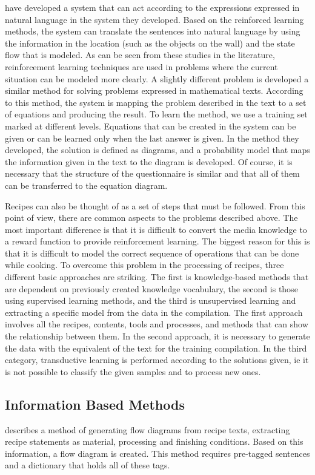 \cite{chen2011learning} have developed a system that can act according to the expressions expressed in natural language in the system they developed. Based on the reinforced learning methods, the system can translate the sentences into natural language by using the information in the location (such as the objects on the wall) and the state flow that is modeled. As can be seen from these studies in the literature, reinforcement learning techniques are used in problems where the current situation can be modeled more clearly.
A slightly different problem is \cite{hosseini2014learning} developed a similar method for solving problems expressed in mathematical texts. According to this method, the system is mapping the problem described in the text to a set of equations and producing the result. To learn the method, we use a training set marked at different levels. Equations that can be created in the system can be given or can be learned only when the last answer is given. In the method they developed, the solution is defined as diagrams, and a probability model that maps the information given in the text to the diagram is developed. Of course, it is necessary that the structure of the questionnaire is similar and that all of them can be transferred to the equation diagram.

Recipes can also be thought of as a set of steps that must be followed. From this point of view, there are common aspects to the problems described above. The most important difference is that it is difficult to convert the media knowledge to a reward function to provide reinforcement learning. The biggest reason for this is that it is difficult to model the correct sequence of operations that can be done while cooking. To overcome this problem in the processing of recipes, three different basic approaches are striking. The first is knowledge-based methods that are dependent on previously created knowledge vocabulary, the second is those using supervised learning methods, and the third is unsupervised learning and extracting a specific model from the data in the compilation. The first approach involves all the recipes, contents, tools and processes, and methods that can show the relationship between them. In the second approach, it is necessary to generate the data with the equivalent of the text for the training compilation. In the third category, transductive learning is performed according to the solutions given, ie it is not possible to classify the given samples and to process new ones.

\subsection{Information Based Methods}
\cite{walter2011workflow} describes a method of generating flow diagrams from recipe texts, extracting recipe statements as material, processing and finishing conditions. Based on this information, a flow diagram is created. This method requires pre-tagged sentences and a dictionary that holds all of these tags.

